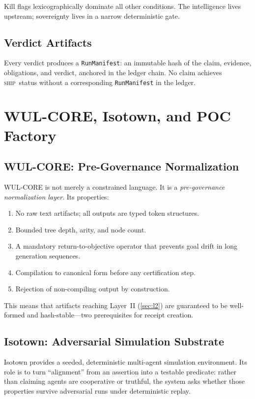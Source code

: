 \documentclass[11pt,a4paper]{article}
\theoremstyle{plain}
\theoremstyle{definition}
\theoremstyle{remark}
\newcommand{\SHIP}{\textsc{ship}}
\begin{document}
Kill flags lexicographically dominate all other conditions.
The intelligence lives upstream; sovereignty lives in a narrow deterministic gate.

\subsection{Verdict Artifacts}

Every verdict produces a \texttt{RunManifest}: an immutable hash of
the claim, evidence, obligations, and verdict,
anchored in the ledger chain.
No claim achieves \SHIP\ status without a corresponding \texttt{RunManifest}
in the ledger.

\section{WUL-CORE, Isotown, and POC Factory}
\label{sec:substrate}

\subsection{WUL-CORE: Pre-Governance Normalization}

WUL-CORE is not merely a constrained language.
It is a \emph{pre-governance normalization layer}.
Its properties:
\begin{enumerate}[nosep]
  \item No raw text artifacts; all outputs are typed token structures.
  \item Bounded tree depth, arity, and node count.
  \item A mandatory return-to-objective operator that prevents
        goal drift in long generation sequences.
  \item Compilation to canonical form before any certification step.
  \item Rejection of non-compiling output by construction.
\end{enumerate}

This means that artifacts reaching Layer~II (\cref{sec:l2}) are guaranteed
to be well-formed and hash-stable---two prerequisites for receipt creation.

\subsection{Isotown: Adversarial Simulation Substrate}

Isotown provides a seeded, deterministic multi-agent simulation environment.
Its role is to turn ``alignment'' from an assertion into a testable predicate:
rather than claiming agents are cooperative or truthful,
the system asks whether those properties survive adversarial runs under
deterministic replay.
\end{document}
